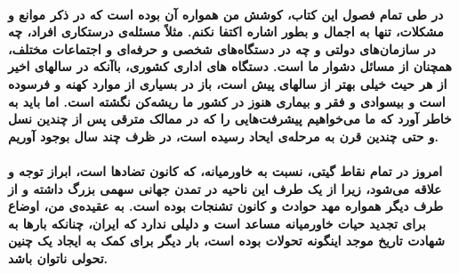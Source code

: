 \paragraph{
در طی تمام فصول این کتاب، کوشش من همواره آن بوده است که در ذکر موانع و مشکلات، تنها به اجمال و بطور اشاره اکتفا نکنم. مثلاً مسئله‌ی درستکاری افراد، چه در سازمان‌های دولتی و چه در دستگاه‌های شخصی و حرفه‌ای و اجتماعات مختلف، همچنان از مسائل دشوار ما است. 
دستگاه های اداری کشوری، باآنکه در سالهای اخیر از هر حیث خیلی بهتر از سالهای پیش است، باز در بسیاری از موارد کهنه و فرسوده است و بیسوادی و فقر و بیماری هنوز در کشور ما ریشه‌کن نگشته است. اما باید به خاطر آورد که ما می‌خواهیم پیشرفت‌هایی را که در ممالک مترقی پس از چندین نسل و حتی چندین قرن به مرحله‌ی ایحاد رسیده است، در ظرف چند سال بوجود آوریم.   
}
\paragraph{
	امروز در تمام نقاط گیتی، نسبت به خاورمیانه، که کانون تضادها است، ابراز توجه و علاقه می‌شود، زیرا از یک طرف این ناحیه در تمدن جهانی سهمی بزرگ داشته و از طرف دیگر همواره مهد حوادث و کانون تشنجات بوده است. به عقیده‌ی من، اوضاع برای تجدید حیات خاورمیانه مساعد است و دلیلی ندارد که ایران، چنانکه بارها به شهادت تاریخ موجد اینگونه تحولات بوده است، بار دیگر برای کمک به ایجاد یک چنین تحولی ناتوان باشد.   
}